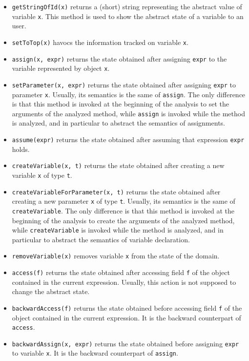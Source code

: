 \documentclass[11pt]{article}
\newcommand{\statement}[1]{\lstinline{#1}}
\begin{document}
\begin{itemize}
\item \statement{getStringOfId(x)} returns a (short) string representing the abstract value of variable \statement{x}. This method is used to show the abstract state of a variable to an user.
\item \statement{setToTop(x)} havocs the information tracked on variable \statement{x}.
\item \statement{assign(x, expr)} returns the state obtained after assigning \statement{expr} to the variable represented by object \statement{x}.
\item \statement{setParameter(x, expr)} returns the state obtained after assigning \statement{expr} to parameter \statement{x}. Usually, its semantics is the same of \statement{assign}. The only difference is that this method is invoked at the beginning of the analysis to set the arguments of the analyzed method, while \statement{assign} is invoked while the method is analyzed, and in particular to abstract the semantics of assignments.
\item \statement{assume(expr)} returns the state obtained after assuming that expression \statement{expr} holds.
\item \statement{createVariable(x, t)} returns the state obtained after creating a new variable \statement{x} of type \statement{t}.
\item \statement{createVariableForParameter(x, t)} returns the state obtained after creating a new parameter \statement{x} of type \statement{t}. Usually, its semantics is the same of \statement{createVariable}. The only difference is that this method is invoked at the beginning of the analysis to create the arguments of the analyzed method, while \statement{createVariable} is invoked while the method is analyzed, and in particular to abstract the semantics of variable declaration.
\item \statement{removeVariable(x)} removes variable \statement{x} from the state of the domain.
\item \statement{access(f)} returns the state obtained after accessing field \statement{f} of the object contained in the current expression. Usually, this action is not supposed to change the abstract state.
\item \statement{backwardAccess(f)} returns the state obtained before accessing field \statement{f} of the object contained in the current expression. It is the backward counterpart of \statement{access}.
\item \statement{backwardAssign(x, expr)} returns the state obtained before assigning \statement{expr} to variable \statement{x}. It is the backward counterpart of \statement{assign}.
\end{itemize}
\end{document}
